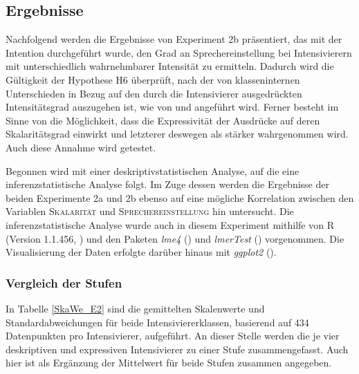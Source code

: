 \subsection{Ergebnisse}\label{abs:Ergebnisse2576}
Nachfolgend werden die Ergebnisse von Experiment 2b präsentiert, das mit der Intention durchgeführt wurde, den Grad an Sprechereinstellung bei Intensivierern mit unterschiedlich wahrnehmbarer Intensität zu ermitteln. {Dadurch} wird die Gültigkeit der Hypothese H6 überprüft, nach der von klasseninternen Unterschieden in Bezug auf den durch die Intensivierer ausgedrückten Intensitätsgrad auszugehen ist, wie von {\citet[87]{Biedermann.1969}} und \citet[408]{Breindl.2007} angeführt wird. Ferner besteht im Sinne von {\citet[133]{Gutzmann.2019a}} die Möglichkeit, dass die Expressivität der Ausdrücke auf deren Skalaritätsgrad einwirkt und letzterer deswegen als stärker wahrgenommen wird. Auch diese Annahme wird getestet.


Begonnen wird mit einer deskriptivstatistischen Analyse, auf die eine inferenzstatistische Analyse folgt. Im Zuge dessen werden die Ergebnisse der beiden {Experimente 2a und 2b} ebenso auf eine mögliche Korrelation zwischen den Variablen \textsc{Skalarität} und \textsc{Sprechereinstellung} hin untersucht. Die inferenzstatistische Analyse wurde auch in diesem Experiment mithilfe von R (Version 1.1.456, \citealt[]{R.2018}) und den Paketen \textit{lme4} ({\citealt[]{Bates.2015}}) und \textit{lmerTest} (\citealt[]{Kuznetsova.2017}) vorgenommen. Die Visualisierung der Daten erfolgte darüber hinaus mit \textit{ggplot2} (\citealt[]{Wickham.2016}).


\subsubsection{Vergleich der Stufen}\label{abs:Deskriptivstatistik02}





\noindent In Tabelle \ref{SkaWe_E2} sind die gemittelten Skalenwerte und Standardabweichungen für beide Intensiviererklassen, basierend auf 434 Datenpunkten pro Intensivierer, aufgeführt. An dieser Stelle werden die je vier deskriptiven und expressiven Intensivierer zu einer Stufe zusammengefasst. Auch hier ist als Ergänzung der Mittelwert für beide Stufen zusammen angegeben. 


